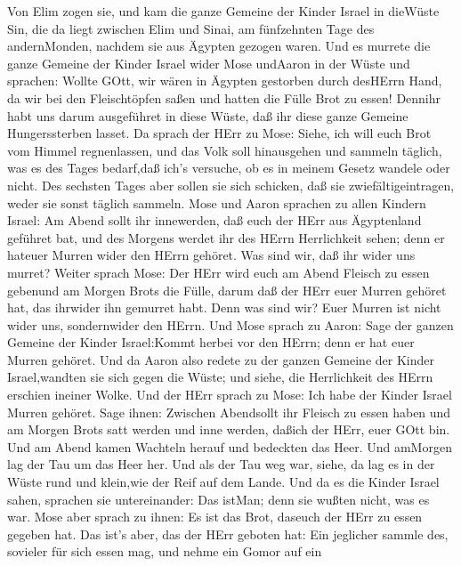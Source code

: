  Von Elim zogen sie, und kam die ganze Gemeine der Kinder
Israel in dieWüste Sin, die da liegt zwischen Elim und Sinai, am
fünfzehnten Tage des andernMonden, nachdem sie aus Ägypten gezogen
waren.  Und es murrete die ganze Gemeine der Kinder Israel
wider Mose undAaron in der Wüste  und sprachen: Wollte GOtt,
wir wären in Ägypten gestorben durch desHErrn Hand, da wir bei den
Fleischtöpfen saßen und hatten die Fülle Brot zu essen! Dennihr habt uns
darum ausgeführet in diese Wüste, daß ihr diese ganze Gemeine
Hungerssterben lasset.  Da sprach der HErr zu Mose: Siehe,
ich will euch Brot vom Himmel regnenlassen, und das Volk soll
hinausgehen und sammeln täglich, was es des Tages bedarf,daß ich's
versuche, ob es in meinem Gesetz wandele oder nicht.  Des
sechsten Tages aber sollen sie sich schicken, daß sie
zwiefältigeintragen, weder sie sonst täglich sammeln.  Mose
und Aaron sprachen zu allen Kindern Israel: Am Abend sollt ihr
innewerden, daß euch der HErr aus Ägyptenland geführet bat, 
und des Morgens werdet ihr des HErrn Herrlichkeit sehen; denn er hateuer
Murren wider den HErrn gehöret. Was sind wir, daß ihr wider uns murret?
 Weiter sprach Mose: Der HErr wird euch am Abend Fleisch zu
essen gebenund am Morgen Brots die Fülle, darum daß der HErr euer Murren
gehöret hat, das ihrwider ihn gemurret habt. Denn was sind wir? Euer
Murren ist nicht wider uns, sondernwider den HErrn.  Und
Mose sprach zu Aaron: Sage der ganzen Gemeine der Kinder Israel:Kommt
herbei vor den HErrn; denn er hat euer Murren gehöret.  Und
da Aaron also redete zu der ganzen Gemeine der Kinder Israel,wandten sie
sich gegen die Wüste; und siehe, die Herrlichkeit des HErrn erschien
ineiner Wolke.  Und der HErr sprach zu Mose: 
Ich habe der Kinder Israel Murren gehöret. Sage ihnen: Zwischen
Abendsollt ihr Fleisch zu essen haben und am Morgen Brots satt werden
und inne werden, daßich der HErr, euer GOtt bin.  Und am
Abend kamen Wachteln herauf und bedeckten das Heer. Und amMorgen lag der
Tau um das Heer her.  Und als der Tau weg war, siehe, da
lag es in der Wüste rund und klein,wie der Reif auf dem Lande.
 Und da es die Kinder Israel sahen, sprachen sie
untereinander: Das istMan; denn sie wußten nicht, was es war. Mose aber
sprach zu ihnen: Es ist das Brot, daseuch der HErr zu essen gegeben hat.
 Das ist's aber, das der HErr geboten hat: Ein jeglicher
sammle des, sovieler für sich essen mag, und nehme ein Gomor auf ein
